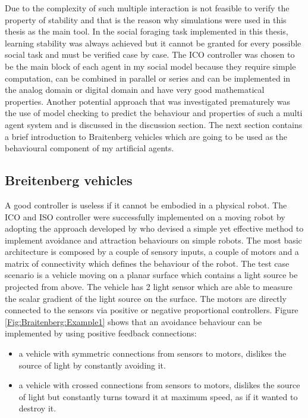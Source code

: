 Due to the complexity of such multiple interaction is not feasible to verify the 
property of stability and that is the reason why simulations were used in this 
thesis as the main tool.
In the social foraging task implemented in this thesis, learning stability was 
always achieved but it cannot be granted for every possible social task and 
must be verified case by case.
The ICO controller \citep{Porr2006ICO} was chosen to be the main block of each agent
 in my social model because they require simple computation, can be combined in parallel or series and
can be implemented in the analog domain or digital domain and have very good mathematical properties.
Another potential approach that was investigated prematurely was the use of 
model checking to predict the behaviour and properties of such a multi agent system and 
is discussed in the discussion section.
The next section contains a brief introduction to Braitenberg vehicles which 
are going to be used as the behavioural component of my artificial agents.

\subsection{Breitenberg vehicles}
\label{Intro:Braitenberg}
A good controller is useless if it cannot be embodied in a physical robot.
The ICO and ISO controller were successfully implemented on a moving robot by
 adopting the approach developed by \citet{Braitenberg1986} who devised a simple
 yet effective method to implement avoidance and attraction behaviours on 
simple robots.
The most basic architecture is composed by a couple of sensory inputs, a couple of motors
and a matrix of connectivity which defines the behaviour of the robot.
The test case scenario is a vehicle moving on a planar surface which contains a light source
 be projected from above.
The vehicle has 2 light sensor which are able to measure the scalar gradient of 
the light source on the surface.
The motors are directly connected to the sensors via positive or negative proportional 
controllers.
Figure \ref{Fig:Braitenberg:Example1} shows that an avoidance behaviour can be implemented
 by using positive feedback connections:

\begin{itemize}
 \item a vehicle with symmetric connections from sensors to motors, dislikes the source 
of light by constantly avoiding it.
 \item a vehicle with crossed connections from sensors to motors, dislikes the source of light
but constantly turns toward it at maximum speed, as if it wanted to destroy it.
\end{itemize}

